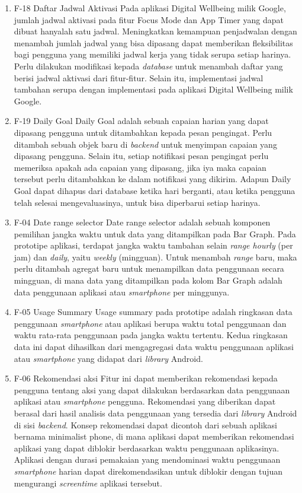 \begin{enumerate}
  \item F-18 Daftar Jadwal Aktivasi
  \subitem Pada aplikasi Digital Wellbeing milik Google, jumlah jadwal aktivasi pada fitur Focus Mode dan App Timer yang dapat dibuat hanyalah satu jadwal. Meningkatkan kemampuan penjadwalan dengan menambah jumlah jadwal yang bisa dipasang dapat memberikan fleksibilitas bagi pengguna yang memiliki jadwal kerja yang tidak serupa setiap harinya. Perlu dilakukan modifikasi kepada \textit{database} untuk menambah daftar yang berisi jadwal aktivasi dari fitur-fitur. Selain itu, implementasi jadwal tambahan  serupa dengan implementasi pada aplikasi Digital Wellbeing milik Google.
    
  \item F-19 Daily Goal
  \subitem Daily Goal adalah sebuah capaian harian yang dapat dipasang pengguna untuk ditambahkan kepada pesan pengingat. Perlu ditambah sebuah objek baru di \textit{backend} untuk menyimpan capaian yang dipasang pengguna. Selain itu, setiap notifikasi pesan pengingat perlu memeriksa apakah ada capaian yang dipasang, jika iya maka capaian tersebut perlu ditambahkan ke dalam notifikasi yang dikirim. Adapun Daily Goal dapat dihapus dari database ketika hari berganti, atau ketika pengguna telah selesai mengevaluasinya, untuk bisa diperbarui setiap harinya.   
    
  \item F-04 Date range selector
  \subitem Date range selector adalah sebuah komponen pemilihan jangka waktu untuk data yang ditampilkan pada Bar Graph. Pada prototipe aplikasi, terdapat jangka waktu tambahan selain \textit{range hourly} (per jam) dan \textit{daily}, yaitu \textit{weekly} (mingguan). Untuk menambah \textit{range} baru, maka perlu ditambah agregat baru untuk menampilkan data penggunaan secara mingguan, di mana data yang ditampilkan pada kolom Bar Graph adalah data penggunaan aplikasi atau \textit{smartphone} per minggunya. 
    
  \item F-05 Usage Summary
  \subitem Usage summary pada prototipe adalah ringkasan data penggunaan \textit{smartphone} atau aplikasi berupa waktu total penggunaan dan waktu rata-rata penggunaan pada jangka waktu tertentu. Kedua ringkasan data ini dapat dihasilkan dari mengagregasi data waktu penggunaan aplikasi atau \textit{smartphone} yang didapat dari \textit{library} Android.
    
  \item F-06 Rekomendasi aksi
  \subitem Fitur ini dapat memberikan rekomendasi kepada pengguna tentang aksi yang dapat dilakukan berdasarkan data penggunaan aplikasi atau \textit{smartphone} pengguna. Rekomendasi yang diberikan dapat berasal dari hasil analisis data penggunaan yang tersedia dari \textit{library} Android di sisi \textit{backend}. Konsep rekomendasi dapat dicontoh dari sebuah aplikasi bernama minimalist phone, di mana aplikasi dapat memberikan rekomendasi aplikasi yang dapat diblokir berdasarkan waktu penggunaan aplikasinya. Aplikasi dengan durasi pemakaian yang mendominasi waktu penggunaan \textit{smartphone} harian dapat direkomendasikan untuk diblokir dengan tujuan mengurangi \textit{screentime} aplikasi tersebut.
    

\end{enumerate}
